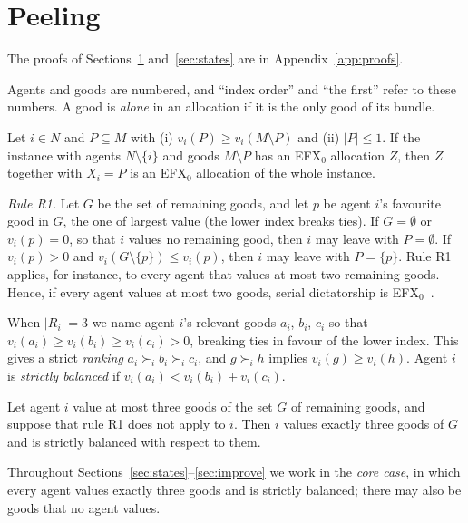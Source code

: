 \documentclass[runningheads,11pt]{llncs}
\newcommand{\efxz}{\texorpdfstring{\mbox{EFX$_0$}}{EFX0}}
\begin{document}
\section{Peeling}\label{sec:peel}

The proofs of Sections~\ref{sec:peel} and~\ref{sec:states} are in Appendix~\ref{app:proofs}.

Agents and goods are numbered, and ``index order'' and ``the first'' refer to these numbers. A good is \emph{alone} in an allocation if it is the only good of its bundle.

\begin{lemma}[peeling]\label{lem:peel}
Let $i\in N$ and $P\subseteq M$ with (i) $v_i(P)\ge v_i(M\setminus P)$ and (ii) $|P|\le1$. If the instance with agents $N\setminus\{i\}$ and goods $M\setminus P$ has an \efxz{} allocation $Z$, then $Z$ together with $X_i=P$ is an \efxz{} allocation of the whole instance.
\end{lemma}
\noindent \emph{Rule R1.} Let $G$ be the set of remaining goods, and let $p$ be agent $i$'s favourite good in $G$, the one of largest value (the lower index breaks ties). If $G=\emptyset$ or $v_i(p)=0$, so that $i$ values no remaining good, then $i$ may leave with $P=\emptyset$. If $v_i(p)>0$ and $v_i(G\setminus\{p\})\le v_i(p)$, then $i$ may leave with $P=\{p\}$. Rule R1 applies, for instance, to every agent that values at most two remaining goods. Hence, if every agent values at most two goods, serial dictatorship is \efxz{}~\cite{MrdEfx}.

\noindent When $|R_i|=3$ we name agent $i$'s relevant goods $a_i$, $b_i$, $c_i$ so that $v_i(a_i)\ge v_i(b_i)\ge v_i(c_i)>0$, breaking ties in favour of the lower index. This gives a strict \emph{ranking} $a_i\succ_i b_i\succ_i c_i$, and $g\succ_i h$ implies $v_i(g)\ge v_i(h)$. Agent $i$ is \emph{strictly balanced} if $v_i(a_i)<v_i(b_i)+v_i(c_i)$.

\begin{lemma}\label{lem:R1fail}
Let agent $i$ value at most three goods of the set $G$ of remaining goods, and suppose that rule R1 does not apply to $i$. Then $i$ values exactly three goods of $G$ and is strictly balanced with respect to them.
\end{lemma}
\noindent Throughout Sections~\ref{sec:states}--\ref{sec:improve} we work in the \emph{core case}, in which every agent values exactly three goods and is strictly balanced; there may also be goods that no agent values.
\end{document}
